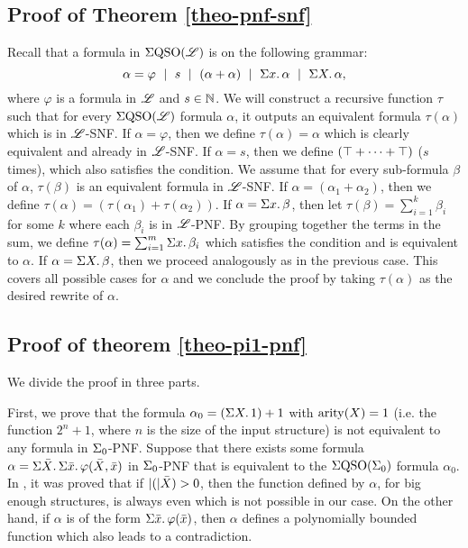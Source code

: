 \subsection*{Proof of Theorem \ref{theo-pnf-snf}}
Recall that a formula in $\Sigma{\rm QSO}(\mathscr{L})$ is on the following grammar:
$$
\alpha = \varphi \ \mid \ s \ \mid \ (\alpha + \alpha) \ \mid \ \sa{x} \alpha \ \mid \ \sa{X} \alpha,
$$
where $\varphi$ is a formula in $\mathscr{L}$ and $s\in\mathbb{N}$. We will construct a recursive function $\tau$ such that for every $\Sigma{\rm QSO}(\mathscr{L})$ formula $\alpha$, it outputs an equivalent formula $\tau(\alpha)$ which is in $\mathscr{L}$-SNF. If $\alpha = \varphi$, then we define $\tau(\alpha) = \alpha$ which is clearly equivalent and already in $\mathscr{L}$-SNF. If $\alpha = s$, then we define $(\top + \cdots + \top)$ ($s$ times), which also satisfies the condition. We assume that for every sub-formula $\beta$ of $\alpha$, $\tau(\beta)$ is an equivalent formula in $\mathscr{L}$-SNF. If $\alpha = (\alpha_1 + \alpha_2)$, then we define $\tau(\alpha) = (\tau(\alpha_1) + \tau(\alpha_2))$. If $\alpha = \Sigma{x}.\,\beta$, then let $\tau(\beta) = \sum_{i = 1}^{k}\beta_i$ for some $k$ where each $\beta_i$ is in $\mathscr{L}$-PNF. By grouping together the terms in the sum, we define $\tau(\alpha) = \sum_{i = 1}^{m}\Sigma{x}.\,\beta_i$ which satisfies the condition and is equivalent to $\alpha$. If $\alpha = \Sigma{X}.\,\beta$, then we proceed analogously as in the previous case. This covers all possible cases for $\alpha$ and we conclude the proof by taking $\tau(\alpha)$ as the desired rewrite of $\alpha$.












\subsection*{Proof of theorem \ref{theo-pi1-pnf}}
We divide the proof in three parts.

\vspace{1em}
First, we prove that the formula $\alpha_{0} = \left( \Sigma{X}.\, 1 \right) + 1$ with ${\rm arity}(X) = 1$ (i.e. the function $2^{n}+1$, where $n$ is the size of the input structure) is not equivalent to any formula in $\Sigma_{0}$-PNF. Suppose that there exists some formula $\alpha = \Sigma{\bar{X}}.\,\Sigma{\bar{x}}.\,\varphi(\bar{X},\bar{x})$ in $\Sigma_{0}$-PNF that is equivalent to the $\Sigma{\rm QSO}(\Sigma_{0})$ formula $\alpha_0$.
In \cite{SalujaST95}, it was proved that if $\vert ( \vert\bar{X}) > 0$, then the function defined by $\alpha$, for big enough structures, is always even which is not possible in our case.
On the other hand, if $\alpha$ is of the form $\Sigma{\bar{x}}.\,\varphi(\bar{x})$, then $\alpha$ defines a polynomially bounded function which also leads to a contradiction.

